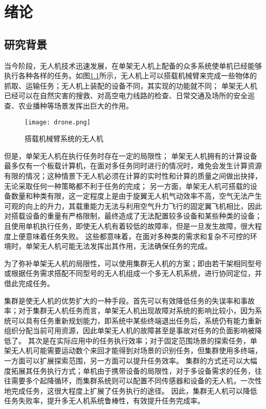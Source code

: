\renewcommand{\baselinestretch}{1.5}
\fontsize{12pt}{13pt}\selectfont

\chapter{绪论}\label{preface}

\section{研究背景}

当今阶段，无人机技术迅速发展，在单架无人机上配备的众多系统使单机已经能够执行各种各样的任务。如图\ref{fig-drone}所示，无人机上可以搭载机械臂来完成一些物体的抓取、运输任务；无人机上装配的设备不同，其实现的功能就不同；
单架无人机已经可以在自然灾害的搜救、对高空电力线路的检查、日常交通及场所的安全巡查、农业播种等场景发挥出巨大的作用。

\begin{figure}[!ht]
	\centering
	\texttt{[image: drone.png]}
	\caption{搭载机械臂系统的无人机} 
	\label{fig-drone}
\end{figure}

但是，单架无人机在执行任务时存在一定的局限性；
单架无人机拥有的计算设备最多仅有一个板载计算机，在面对多任务同时进行的情况时，难免会发生计算资源有限的情况；这种情景下无人机必须在计算的实时性和计算的质量之间做出抉择，无论采取任何一种策略都不利于任务的完成；
另一方面，单架无人机可搭载的设备数量和种类有限，这一定程度上是由于旋翼无人机气动效率不高，空气无法产生可观的向上的升力，其载重能力无法与利用空气升力飞行的固定翼飞机相比，因此对搭载设备的重量有严格限制，最终造成了无法配置较多设备和某些种类的设备；
且使用单机执行任务，即使无人机有着较低的故障率，但是一旦发生故障，很大程度上便意味着任务失败。
这些都意味着，在面对多种类的需求和复杂不可控的环境时，单架无人机可能无法发挥出其作用，无法确保任务的完成。

为了弥补单架无人机的局限性，可以使用集群无人机的方案；即由若干架相同型号或根据任务需求搭配不同型号的无人机组成一个多无人机系统，进行协同定位，并借此完成任务。

集群是使无人机的优势扩大的一种手段。首先可以有效降低任务的失误率和事故率；对于集群无人机任务而言，单架无人机出现故障对系统的影响比较小，因为系统可以具有任务重新规划能力，即系统中某些终端退出任务后，系统仍有能力重新组织分配当前可用资源，因此单架无人机的故障甚至是事故对任务的负面影响被降低了。
其次是在实际应用中的任务执行效率；对于固定范围场景的探索任务，单架无人机可能需要运动数个来回才能得到对场景的识别任务，但集群使用多终端，一方面可以扩展探索范围，另一方面可以提升任务效率。
集群的方式还可以大幅度拓展其任务执行方式；单机由于携带设备的局限性，对于多设备需求的任务，往往需要多个起降循环，而集群系统则可以配置不同传感器和设备的无人机，一次性地完成任务，这很大程度上扩展了任务执行的途径。
因此，集群无人机可以降低任务失败率，提升多无人机系统鲁棒性，有效提升任务完成率。

